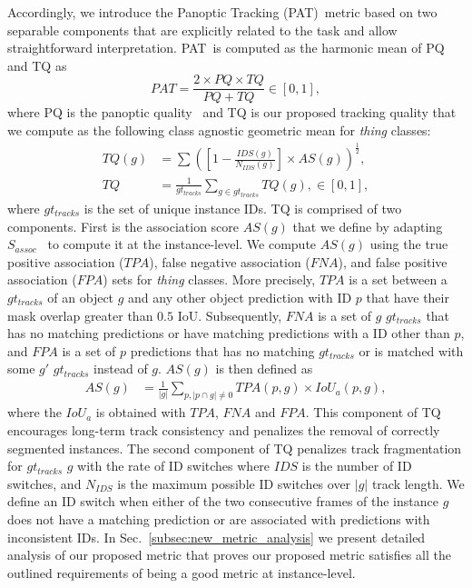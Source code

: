 \documentclass[letterpaper, 10 pt, journal, twoside]{IEEEtran}
\newcommand{\secref}[1]{Sec.~\ref{#1}}
\newcommand{\newmet}{PAT}
\begin{document}
Accordingly, we introduce the Panoptic Tracking (\newmet)~metric based on two separable components that are explicitly related to the task and allow straightforward interpretation. \newmet~is computed as the harmonic mean of PQ and TQ as
\begin{equation}
    \newmet =  \frac{2 \times PQ \times TQ}{PQ + TQ}   \in [0,1],
\end{equation}
where PQ is the panoptic quality~\cite{kirillov2019panoptic} and TQ is our proposed tracking quality that we compute as the following class agnostic geometric mean for \emph{thing} classes:
\begin{align}
TQ(g) &= \sum([1-\frac{IDS(g)}{N_{IDS}(g)}]\times AS(g))^{\frac{1}{2}} , \label{eq:track_quality_1} \\
TQ &= \frac{1}{gt_{tracks}}\sum_{g\in gt_{tracks}} TQ(g), \in [0,1], \label{eq:track_quality_2}
\end{align}
where $gt_{tracks}$ is the set of unique instance IDs. TQ is comprised of two components. First is the association score $AS(g)$ that we define by adapting $S_{assoc}$~\cite{aygun20214d} to compute it at the instance-level. We compute $AS(g)$ using the true positive association ($TPA$), false negative association ($FNA$), and false positive association ($FPA$) sets for \emph{thing} classes. More precisely, $TPA$ is a set between a $gt_{tracks}$ of an object $g$  and any other object prediction with ID $p$ that have their mask overlap greater than $0.5$ IoU. Subsequently, $FNA$ is a set of $g$ $gt_{tracks}$ that has no matching predictions or have matching predictions with a ID other than $p$, and $FPA$ is a set of $p$ predictions that has no matching $gt_{tracks}$ or is matched with some $g'$ $gt_{tracks}$ instead of $g$. $AS(g)$ is then defined as
\begin{align}
    AS(g) &= \frac{1}{|g|}\sum_{p,|p \cap g|\ne 0}TPA(p,g)\times IoU_{a}(p,g), 
\end{align}
where the $IoU_{a}$ is obtained with $TPA$, $FNA$ and $FPA$.
This component of TQ encourages long-term track consistency and penalizes the removal of correctly segmented instances. The second component of TQ penalizes track fragmentation for $gt_{tracks}$ $g$ with the rate of ID switches where $IDS$ is the number of ID switches, and $N_{IDS}$ is the maximum possible ID switches over $|g|$ track length. We define an ID switch when either of the two consecutive frames of the instance $g$ does not have a matching prediction or are associated with predictions with inconsistent IDs. In \secref{subsec:new_metric_analysis} we present detailed analysis of our proposed metric that proves our proposed metric satisfies all the outlined requirements of being a good metric at instance-level. 
\end{document}
